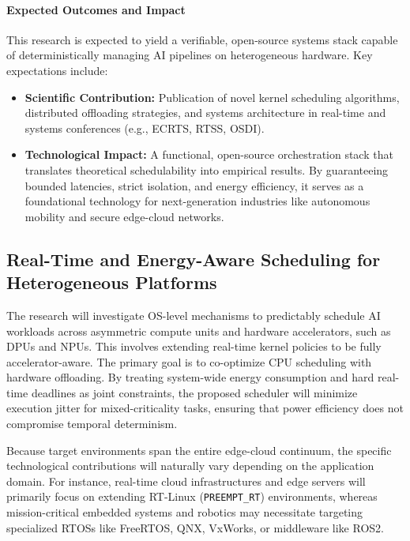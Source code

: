 \documentclass[11pt,a4paper]{article}
\begin{document}
\paragraph{Expected Outcomes and Impact}
This research is expected to yield a verifiable, open-source systems stack capable of deterministically managing AI pipelines on heterogeneous hardware. Key expectations include:
\begin{itemize}
    \item \textbf{Scientific Contribution:} Publication of novel kernel scheduling algorithms, distributed offloading strategies, and systems architecture in real-time and systems conferences (e.g., ECRTS, RTSS, OSDI).
    \item \textbf{Technological Impact:} A functional, open-source orchestration stack that translates theoretical schedulability into empirical results. By guaranteeing bounded latencies, strict isolation, and energy efficiency, it serves as a foundational technology for next-generation industries like autonomous mobility and secure edge-cloud networks.
\end{itemize}

\subsection{Real-Time and Energy-Aware Scheduling for Heterogeneous Platforms}
\label{sec:rt-aw-sched}
    The research will investigate OS-level mechanisms to predictably schedule AI workloads across asymmetric compute units and hardware accelerators, such as DPUs and NPUs. This involves extending real-time kernel policies to be fully accelerator-aware. The primary goal is to co-optimize CPU scheduling with hardware offloading. By treating system-wide energy consumption and hard real-time deadlines as joint constraints, the proposed scheduler will minimize execution jitter for mixed-criticality tasks, ensuring that power efficiency does not compromise temporal determinism.

    Because target environments span the entire edge-cloud continuum, the specific technological contributions will naturally vary depending on the application domain. For instance, real-time cloud infrastructures and edge servers will primarily focus on extending RT-Linux (\texttt{PREEMPT\_RT}) environments, whereas mission-critical embedded systems and robotics may necessitate targeting specialized RTOSs like FreeRTOS, QNX, VxWorks, or middleware like ROS2.
\end{document}
